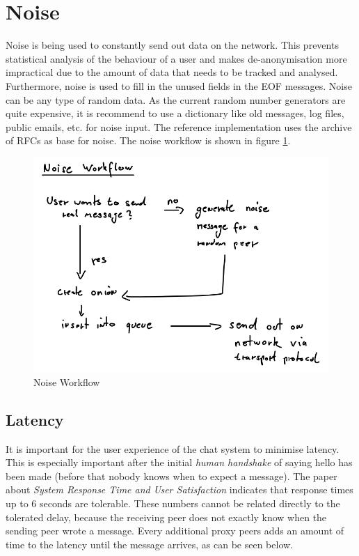 \section{Noise}
\label{noise}
Noise is being used to constantly send out data on the network.
This prevents statistical analysis of the behaviour of a user and makes
de-anonymisation more impractical due to the amount of data that needs
to be tracked and analysed.
Furthermore, noise is used to fill in the unused fields in the EOF messages.
Noise can be any type of random data. As the current random number generators
are quite expensive, it is recommend to use a dictionary like old 
messages, log files, public emails, etc. for noise input.
The reference implementation uses the archive of RFCs as base for noise.
The noise workflow is shown in figure \ref{noiseworkflow}.
\begin{figure}
    \centering
    \caption{Noise Workflow}
    \label{noiseworkflow}
    \includegraphics[scale=0.8]{noiseworkflow.png}
\end{figure}
\subsection{Latency}
\label{latency}
It is important for the user experience of the chat system to minimise latency.
This is especially important after the initial \textit{human handshake}
of saying hello has been made (before that nobody knows when to expect
a message).
The paper about
\textit{System Response Time and User Satisfaction}\cite{responsetime}
indicates that response times up to 6 seconds are tolerable. These numbers
cannot be related directly to the tolerated delay, because the receiving
peer does not exactly know when the sending peer wrote a message.
Every additional proxy peers adds an amount of time to the latency until the
message arrives, as can be seen below.
